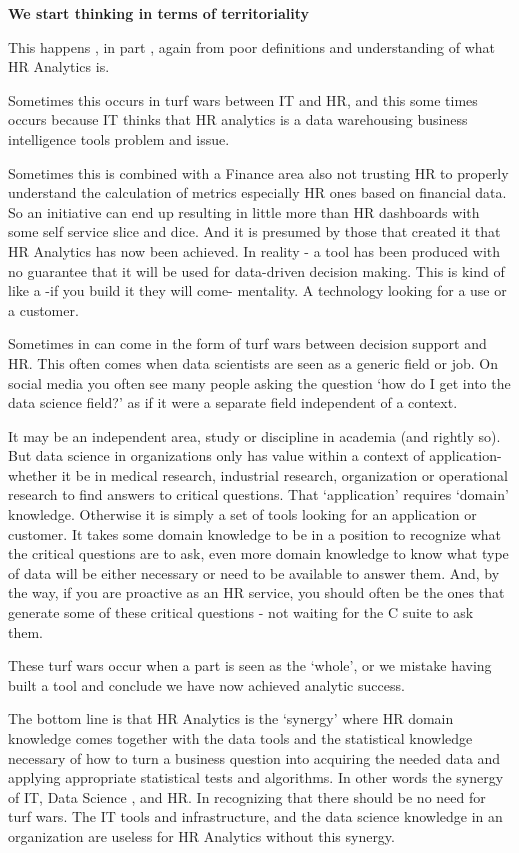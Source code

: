 \documentclass[12pt,letterpaper]{article}
\begin{document}
\textbf{We start thinking in terms of territoriality}

This happens , in part , again from poor definitions and understanding
of what HR Analytics is.

Sometimes this occurs in turf wars between IT and HR, and this some
times occurs because IT thinks that HR analytics is a data warehousing
business intelligence tools problem and issue.

Sometimes this is combined with a Finance area also not trusting HR to
properly understand the calculation of metrics especially HR ones based
on financial data. So an initiative can end up resulting in little more
than HR dashboards with some self service slice and dice. And it is
presumed by those that created it that HR Analytics has now been
achieved. In reality - a tool has been produced with no guarantee that
it will be used for data-driven decision making. This is kind of like a
-if you build it they will come- mentality. A technology looking for a
use or a customer.

Sometimes in can come in the form of turf wars between decision support
and HR. This often comes when data scientists are seen as a generic
field or job. On social media you often see many people asking the
question `how do I get into the data science field?' as if it were a
separate field independent of a context.

It may be an independent area, study or discipline in academia (and
rightly so). But data science in organizations only has value within a
context of application- whether it be in medical research, industrial
research, organization or operational research to find answers to
critical questions. That `application' requires `domain' knowledge.
Otherwise it is simply a set of tools looking for an application or
customer. It takes some domain knowledge to be in a position to
recognize what the critical questions are to ask, even more domain
knowledge to know what type of data will be either necessary or need to
be available to answer them. And, by the way, if you are proactive as an
HR service, you should often be the ones that generate some of these
critical questions - not waiting for the C suite to ask them.

These turf wars occur when a part is seen as the `whole', or we mistake
having built a tool and conclude we have now achieved analytic success.

The bottom line is that HR Analytics is the `synergy' where HR domain
knowledge comes together with the data tools and the statistical
knowledge necessary of how to turn a business question into acquiring
the needed data and applying appropriate statistical tests and
algorithms. In other words the synergy of IT, Data Science , and HR. In
recognizing that there should be no need for turf wars. The IT tools and
infrastructure, and the data science knowledge in an organization are
useless for HR Analytics without this synergy.
\end{document}
